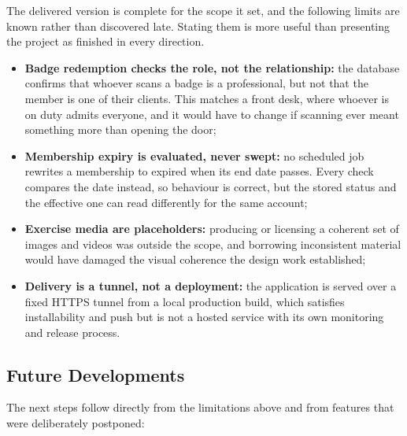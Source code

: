 The delivered version is complete for the scope it set, and the following limits are known rather than discovered late. Stating them is more useful than presenting the project as finished in every direction.

\begin{itemize}[leftmargin=*,nosep]
    \item \textbf{Badge redemption checks the role, not the relationship:} the database confirms that whoever scans a badge is a professional, but not that the member is one of their clients. This matches a front desk, where whoever is on duty admits everyone, and it would have to change if scanning ever meant something more than opening the door;
    \item \textbf{Membership expiry is evaluated, never swept:} no scheduled job rewrites a membership to expired when its end date passes. Every check compares the date instead, so behaviour is correct, but the stored status and the effective one can read differently for the same account;
    \item \textbf{Exercise media are placeholders:} producing or licensing a coherent set of images and videos was outside the scope, and borrowing inconsistent material would have damaged the visual coherence the design work established;
    \item \textbf{Delivery is a tunnel, not a deployment:} the application is served over a fixed HTTPS tunnel from a local production build, which satisfies installability and push but is not a hosted service with its own monitoring and release process.
\end{itemize}

\subsection{Future Developments}\label{subsect:FutureDevelopments}

The next steps follow directly from the limitations above and from features that were deliberately postponed:

